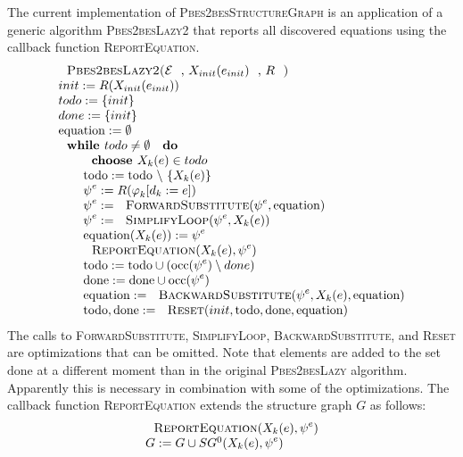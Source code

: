 The current implementation of \textsc{Pbes2besStructureGraph} is an
application of a generic algorithm \textsc{Pbes2besLazy2} that reports all
discovered equations using the callback function \textsc{ReportEquation}.%
\begin{equation*}
\begin{array}{l}
\text{\textsc{Pbes2besLazy2(}}\mathcal{E}\text{, }X_{init}(e_{init})\text{, }%
R\text{\textsc{)}} \\ 
init:=R(X_{init}(e_{init})) \\ 
todo:=\{init\} \\ 
done:=\{init\} \\ 
\mathrm{equation}:=\emptyset  \\ 
\text{\textbf{while }}todo\neq \emptyset \text{ \textbf{do}} \\ 
\qquad \text{\textbf{choose }}X_{k}(e)\in todo \\ 
\qquad \mathrm{todo}:=\mathrm{todo}\ \backslash \ \{X_{k}(e)\} \\ 
\qquad \psi ^{e}:=R(\varphi _{k}[d_{k}:=e]) \\ 
\qquad \psi ^{e}:=\text{\textsc{ForwardSubstitute}}(\psi ^{e},\mathrm{%
equation}) \\ 
\qquad \psi ^{e}:=\text{\textsc{SimplifyLoop}}(\psi ^{e},X_{k}(e)) \\ 
\qquad \mathrm{equation}(X_{k}(e)):=\psi ^{e} \\ 
\qquad \text{\textsc{ReportEquation}}(X_{k}(e),\psi ^{e}) \\ 
\qquad \mathrm{todo}:=\mathrm{todo}\cup (\mathrm{occ}(\psi ^{e})\setminus
done) \\ 
\qquad \mathrm{done}:=\mathrm{done}\cup \mathrm{occ}(\psi ^{e}) \\ 
\qquad \mathrm{equation}:=\text{\textsc{BackwardSubstitute}}(\psi
^{e},X_{k}(e),\mathrm{equation}) \\ 
\qquad \mathrm{todo},\mathrm{done}:=\text{\textsc{Reset}}(init,\mathrm{todo},%
\mathrm{done},\mathrm{equation})%
\end{array}%
\end{equation*}%
The calls to \textsc{ForwardSubstitute}, \textsc{SimplifyLoop}, \textsc{%
BackwardSubstitute}, and \textsc{Reset} are optimizations that can be
omitted. Note that elements are added to the set $\mathrm{done}$ at a
different moment than in the original \textsc{Pbes2besLazy} algorithm.
Apparently this is necessary in combination with some of the optimizations.
The callback function \textsc{ReportEquation} extends the structure graph $G$
as follows:%
\begin{equation*}
\begin{array}{l}
\text{\textsc{ReportEquation}}(X_{k}(e),\psi ^{e}) \\ 
G:=G\cup SG^{0}(X_{k}(e),\psi ^{e})%
\end{array}%
\end{equation*}

